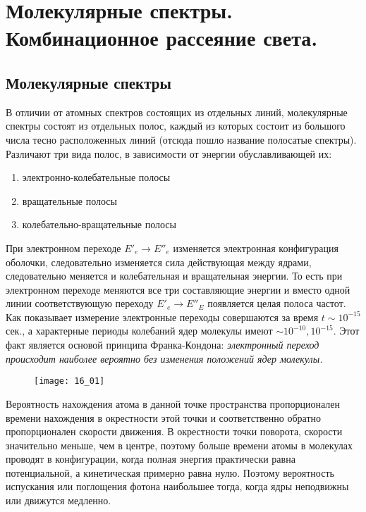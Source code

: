 \chapter{Молекулярные спектры. Комбинационное рассеяние света.}

\section{Молекулярные спектры}
В отличии от атомных спектров состоящих из отдельных линий, молекулярные 
спектры состоят из отдельных полос, каждый из которых состоит из большого 
числа тесно расположенных линий (отсюда пошло название полосатые спектры). 
Различают три вида полос, в зависимости от энергии обуславливающей их:
\begin{enumerate}
    \item электронно-колебательные полосы
    \item вращательные полосы
    \item колебательно-вращательные полосы
\end{enumerate}

При электронном переходе \( E'_e \rightarrow E''_e \) изменяется 
электронная конфигурация оболочки, следовательно изменяется сила 
действующая между ядрами, следовательно меняется и колебательная и 
вращательная энергии. То есть при электронном переходе меняются все три 
составляющие энергии и вместо одной линии соответствующую переходу 
\( E'_e \rightarrow E''_E \) появляется целая полоса частот. Как 
показывает измерение электронные переходы совершаются за время 
\( t \sim 10^{-15} \) сек., а характерные периоды колебаний ядер молекулы 
имеют \( \sim 10^{-10}, 10^{-15} \). Этот факт является основой принципа 
Франка-Кондона: \emph{электронный переход происходит наиболее вероятно без 
изменения положений ядер молекулы.} 

\begin{figure}[h!]
    \center
    \texttt{[image: 16\_01]}
\end{figure}

Вероятность нахождения атома в данной точке пространства пропорционален 
времени нахождения в окрестности этой точки и соответственно обратно 
пропорционален скорости движения. В окрестности точки поворота, скорости 
значительно меньше, чем в центре, поэтому больше времени атомы в молекулах 
проводят в конфигурации, когда полная энергия практически равна 
потенциальной, а кинетическая примерно равна нулю. Поэтому вероятность 
испускания или поглощения фотона наибольшее тогда, когда ядры неподвижны 
или движутся медленно.

